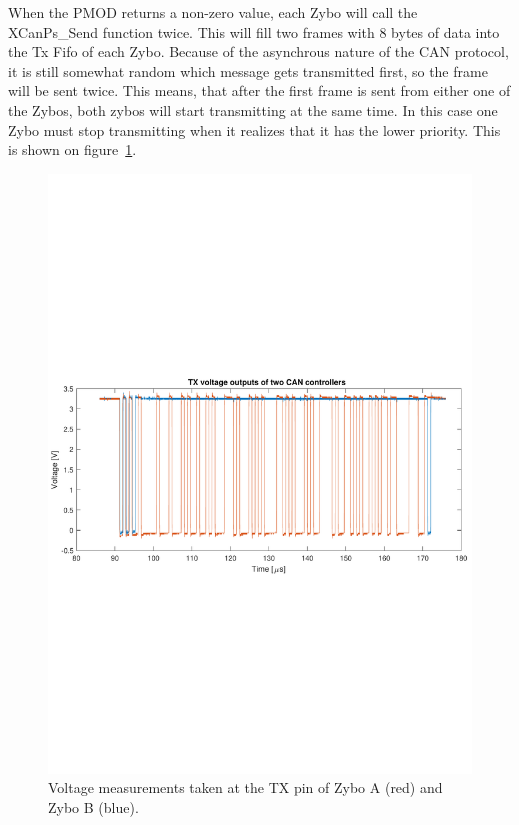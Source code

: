 When the PMOD returns a non-zero value, each Zybo will call the XCanPs\_Send function twice.
This will fill two frames with 8 bytes of data into the Tx Fifo of each Zybo. 
Because of the asynchrous nature of the CAN protocol, it is still somewhat random which message gets transmitted first, so the frame will be sent twice. 
This means, that after the first frame is sent from either one of the Zybos, both zybos will start transmitting at the same time. 
In this case one Zybo must stop transmitting when it realizes that it has the lower priority.
This is shown on figure~\ref{fig:CAN_test3_2TX}.\\

\begin{figure}[h]
	\centering
	\includegraphics[width = \linewidth]{graphics/CAN_test3_2TX}
	\caption{Voltage measurements taken at the TX pin of Zybo A (red) and Zybo B (blue).}
	\label{fig:CAN_test3_2TX}
\end{figure}

